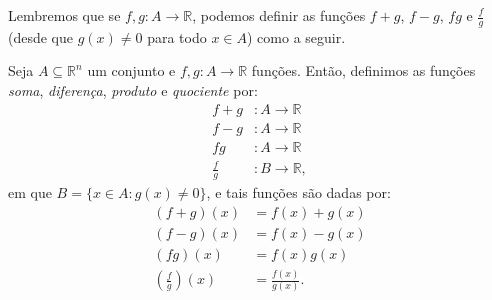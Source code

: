 

Lembremos que se $f, g: A \to \mathbb R$, podemos definir as funções $f+g$, $f-g$, $fg$ e $\frac{f}{g}$ (desde que $g(x)\neq 0$ para todo $x \in A$) como a seguir.

\begin{definition}
    Seja $A\subseteq \mathbb R^n$ um conjunto e $f, g: A \to \mathbb R$ funções.
    Então, definimos as funções \emph{soma}, \emph{diferença}, \emph{produto} e \emph{quociente} por:
    \begin{align*}
        f+g &: A\rightarrow \mathbb R \\
        f-g &: A\rightarrow \mathbb R \\
        fg &: A\rightarrow \mathbb R \\
        \frac{f}{g} &: B\rightarrow \mathbb R,
    \end{align*}
    em que $B=\{x \in A : g(x)\neq 0\}$, e tais funções são dadas por:
    \begin{align*}
        (f+g)(x) &= f(x) + g(x) \\
        (f-g)(x) &= f(x) - g(x) \\
        (fg)(x) &= f(x)g(x) \\
        \left(\frac{f}{g}\right)(x) &= \frac{f(x)}{g(x)}.
    \end{align*}
\end{definition}


